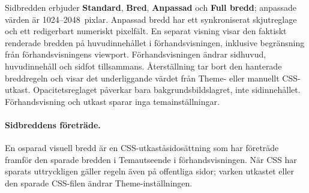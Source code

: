 \documentclass[11pt,a4paper]{article}
\newcommand{\ui}[1]{\textbf{#1}}
\begin{document}
Sidbredden erbjuder \ui{Standard}, \ui{Bred}, \ui{Anpassad} och \ui{Full bredd};
anpassade värden är 1024--2048~pixlar. Anpassad bredd har ett synkroniserat
skjutreglage och ett redigerbart numeriskt pixelfält. En separat visning visar
den faktiskt renderade bredden på huvudinnehållet i förhandsvisningen, inklusive
begränsning från förhandsvisningens viewport. Förhandsvisningen ändrar sidhuvud,
huvudinnehåll och sidfot tillsammans. Återställning tar bort den hanterade
breddregeln och visar det underliggande värdet från Theme- eller manuellt
CSS-utkast. Opacitetsreglaget påverkar bara bakgrundsbildslagret, inte
sidinnehållet. Förhandsvisning och utkast sparar inga temainställningar.
\paragraph{Sidbreddens företräde.} En osparad visuell bredd är en
CSS-utkaståsidosättning som har företräde framför den sparade bredden i
Temautseende i förhandsvisningen. När CSS har sparats uttryckligen gäller regeln
även på offentliga sidor; varken utkastet eller den sparade CSS-filen ändrar
Theme-inställningen.
\end{document}
